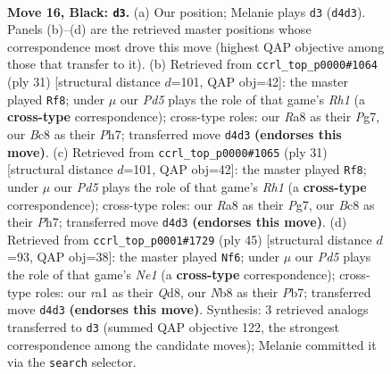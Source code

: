 \documentclass[11pt]{article}
\begin{document}
\clearpage

\begin{figure}[p]\centering
\begin{subfigure}{0.46\textwidth}\centering
\resizebox{\linewidth}{!}{%
\newchessgame
\chessboard[
  setfen={rnb1k2b/pp6/6p1/q5P1/3pP3/8/P4K2/R1BQ1BN1 b q - 2 16},
  showmover=false,
  pgfstyle=straightmove, color=movearrow, markmove={d4-d3}
]}
\caption{}
\end{subfigure}\hfill
\begin{subfigure}{0.46\textwidth}\centering
\resizebox{\linewidth}{!}{%
\newchessgame
\chessboard[
  setfen={4k2r/pp4pp/2n1p3/2b5/5B2/2P5/P4PPP/R2B2K1 b k - 1 16},
  showmover=false,
  pgfstyle=straightmove, color=movearrow, markmove={h8-f8}
]}
\caption{}
\end{subfigure}
\\[4pt]
\begin{subfigure}{0.46\textwidth}\centering
\resizebox{\linewidth}{!}{%
\newchessgame
\chessboard[
  setfen={4k2r/pp4pp/2n1p3/2b5/5B2/2P5/P4PPP/R2B2K1 b k - 1 16},
  showmover=false,
  pgfstyle=straightmove, color=movearrow, markmove={h8-f8}
]}
\caption{}
\end{subfigure}\hfill
\begin{subfigure}{0.46\textwidth}\centering
\resizebox{\linewidth}{!}{%
\newchessgame
\chessboard[
  setfen={3qn1k1/pp3pp1/8/2br3p/8/1P4P1/PBR2P1P/4QBK1 b - - 1 23},
  showmover=false,
  pgfstyle=straightmove, color=movearrow, markmove={e8-f6}
]}
\caption{}
\end{subfigure}
\caption{\textbf{Move 16, Black: \texttt{d3}.} (a) Our position; Melanie plays \texttt{d3} (\texttt{d4d3}). Panels (b)--(d) are the retrieved master positions whose correspondence most drove this move (highest QAP objective among those that transfer to it). (b) Retrieved from \texttt{ccrl\_top\_p0000\#1064} (ply 31) [structural distance $d$=101, QAP obj=42]: the master played \texttt{Rf8}; under $\mu$ our \emph{Pd5} plays the role of that game's \emph{Rh1} (a \textbf{cross-type} correspondence); cross-type roles: our \emph{R}a8 as their \emph{P}g7, our \emph{B}c8 as their \emph{P}h7; transferred move \texttt{d4d3} \textbf{(endorses this move)}. (c) Retrieved from \texttt{ccrl\_top\_p0000\#1065} (ply 31) [structural distance $d$=101, QAP obj=42]: the master played \texttt{Rf8}; under $\mu$ our \emph{Pd5} plays the role of that game's \emph{Rh1} (a \textbf{cross-type} correspondence); cross-type roles: our \emph{R}a8 as their \emph{P}g7, our \emph{B}c8 as their \emph{P}h7; transferred move \texttt{d4d3} \textbf{(endorses this move)}. (d) Retrieved from \texttt{ccrl\_top\_p0001\#1729} (ply 45) [structural distance $d$=93, QAP obj=38]: the master played \texttt{Nf6}; under $\mu$ our \emph{Pd5} plays the role of that game's \emph{Ne1} (a \textbf{cross-type} correspondence); cross-type roles: our \emph{r}a1 as their \emph{Q}d8, our \emph{N}b8 as their \emph{P}b7; transferred move \texttt{d4d3} \textbf{(endorses this move)}. Synthesis: 3 retrieved analogs transferred to \texttt{d3} (summed QAP objective 122, the strongest correspondence among the candidate moves); Melanie committed it via the \texttt{search} selector.}
\label{fig:thought-m31}
\end{figure}
\end{document}
